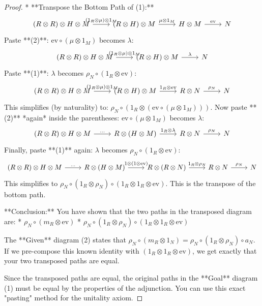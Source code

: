\documentclass[11pt, letterpaper]{article}
\begin{document}
\begin{proof}
* **Transpose the Bottom Path of (1):**
    $$
    \begin{tikzcd}
    (R \otimes R) \otimes H \otimes M \ar[r, "(1_R \otimes \mu) \otimes 1_M"] & (R \otimes H) \otimes M \ar[r, "\mu \otimes 1_M"] & H \otimes M \ar[r, "\mathrm{ev}"] & N
    \end{tikzcd}
    $$
    Paste **(2)**: $\mathrm{ev} \circ (\mu \otimes 1_M)$ becomes $\lambda$:
    $$
    \begin{tikzcd}
    (R \otimes R) \otimes H \otimes M \ar[r, "(1_R \otimes \mu) \otimes 1_M"] & (R \otimes H) \otimes M \ar[r, "\lambda"] & N
    \end{tikzcd}
    $$
    Paste **(1)**: $\lambda$ becomes $\rho_N \circ (1_R \otimes \mathrm{ev})$:
    $$
    \begin{tikzcd}
    (R \otimes R) \otimes H \otimes M \ar[r, "(1_R \otimes \mu) \otimes 1_M"] & (R \otimes H) \otimes M \ar[r, "1_R \otimes \mathrm{ev}"] & R \otimes N \ar[r, "\rho_N"] & N
    \end{tikzcd}
    $$
    This simplifies (by naturality) to: $\rho_N \circ (1_R \otimes (\mathrm{ev} \circ (\mu \otimes 1_M)))$.
    Now paste **(2)** *again* inside the parentheses: $\mathrm{ev} \circ (\mu \otimes 1_M)$ becomes $\lambda$:
    $$
    \begin{tikzcd}
    (R \otimes R) \otimes H \otimes M \ar[r, "..."] & R \otimes (H \otimes M) \ar[r, "1_R \otimes \lambda"] & R \otimes N \ar[r, "\rho_N"] & N
    \end{tikzcd}
    $$
    Finally, paste **(1)** again: $\lambda$ becomes $\rho_N \circ (1_R \otimes \mathrm{ev})$:
    $$
    \begin{tikzcd}
    (R \otimes R) \otimes H \otimes M \ar[r, "..."] & R \otimes (H \otimes M) \ar[r, "1 \otimes (1 \otimes \mathrm{ev})"] & R \otimes (R \otimes N) \ar[r, "1_R \otimes \rho_N"] & R \otimes N \ar[r, "\rho_N"] & N
    \end{tikzcd}
    $$
    This simplifies to $\rho_N \circ (1_R \otimes \rho_N) \circ (1_R \otimes 1_R \otimes \mathrm{ev})$. This is the transpose of the bottom path.

**Conclusion:**
You have shown that the two paths in the transposed diagram are:
* $\rho_N \circ (m_R \otimes \mathrm{ev})$
* $\rho_N \circ (1_R \otimes \rho_N) \circ (1_R \otimes 1_R \otimes \mathrm{ev})$

The **Given** diagram (2) states that $\rho_N \circ (m_R \otimes 1_N) = \rho_N \circ (1_R \otimes \rho_N) \circ a_N$.
If we pre-compose this known identity with $(1_R \otimes 1_R \otimes \mathrm{ev})$, we get exactly that your two transposed paths are equal.

Since the transposed paths are equal, the original paths in the **Goal** diagram (1) must be equal by the properties of the adjunction. You can use this exact "pasting" method for the unitality axiom.
\end{proof}
\end{document}
